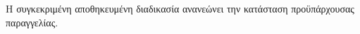 Η συγκεκριμένη αποθηκευμένη διαδικασία ανανεώνει την κατάσταση προϋπάρχουσας παραγγελίας.
\hfill \break